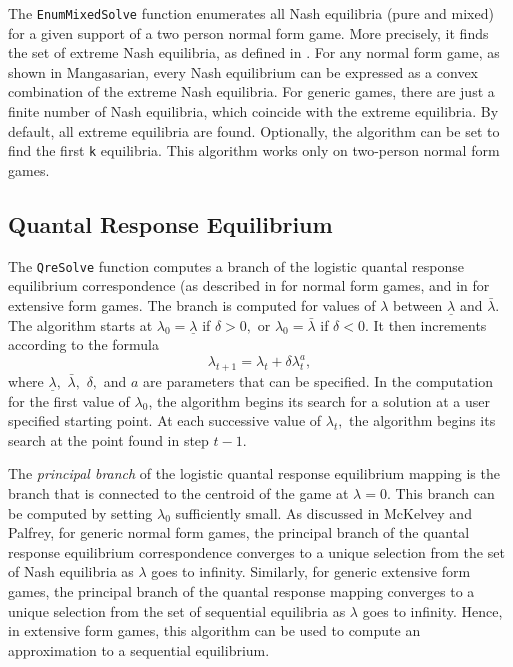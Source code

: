 The \texttt{EnumMixedSolve} function enumerates all Nash equilibria (pure
and mixed) for a given support of a two person normal form game.  More
precisely, it finds the set of extreme Nash equilibria, as defined in
\cite{Man:64}.  For any normal form game, as shown in
Mangasarian, every Nash equilibrium can be expressed as a convex
combination of the extreme Nash equilibria.  For generic games, there
are just a finite number of Nash equilibria, which coincide with the
extreme equilibria.  By default, all extreme equilibria are found.
Optionally, the algorithm can be set to find the first \verb+k+
equilibria.  This algorithm works only on two-person normal form
games.

\subsection{Quantal Response Equilibrium}

The \texttt{QreSolve} function computes a branch of the logistic
quantal response equilibrium correspondence (as described in
\cite{McKPal:95a} for normal form games, and in
\cite{McKPal:95b} for extensive form games.  The branch is
computed for values of $\lambda$ between $\underline{\lambda}$ and
$\bar{\lambda}.$ The algorithm starts at $\lambda_0 =
\underline{\lambda}$ if $\delta>0,$ or $\lambda_0 = \bar{\lambda}$ if
$\delta<0$. It then increments according to the formula
$$
\lambda_{t+1} = \lambda_t +\delta \lambda_t^a,
$$ 
where $\underline\lambda,$ $\bar\lambda,$ $\delta,$ and $a$ are
parameters that can be specified.  In the computation for the first value of
$\lambda_0$, the algorithm begins its search for a solution at a user
specified starting point.  At each
successive value of $\lambda_t,$ the algorithm begins its search at
the point found in step $t - 1.$ 

The {\em principal branch} of the logistic quantal response
equilibrium mapping is the branch that is connected to the centroid of
the game at $\lambda = 0$.  This branch can be computed by setting
$\lambda_0$ sufficiently small.  As discussed in McKelvey and Palfrey,
for generic normal form games, the principal branch of the quantal
response equilibrium correspondence converges to a unique selection
from the set of Nash equilibria as $\lambda$ goes to infinity.
Similarly, for generic extensive form games, the principal branch of
the quantal response mapping converges to a unique selection from the
set of sequential equilibria as $\lambda$ goes to infinity.  Hence, in
extensive form games, this algorithm can be used to compute an
approximation to a sequential equilibrium.

